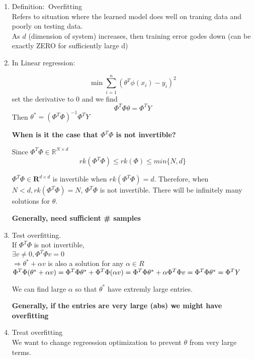 \documentclass[12pt]{article}
\newcommand{\defi}{{\color{blue} Definition: $\ $}}
\newcommand{\Rb}{\mathbf{R}}
\begin{document}
        \begin{enumerate}
            \item \defi Overfitting\\
            Refers to situation where the learned model does well on traning data and poorly on testing data.\\
            As $d$ (dimension of system) increases, then training error godes down (can be exactly ZERO for sufficiently large d)

            \item In Linear regression:
            
            $$\min \sum_{i = 1}^n (\theta^T \phi(x_i) - y_i)^2$$ set the derivative to 0 and we find $$\Phi^T \Phi \theta = \Phi^T Y$$ Then $\theta^* = (\Phi^T \Phi)^{-1}\Phi^T Y$

            \textbf{When is it the case that $\Phi^T\Phi$ is not invertible?}
            
            Since $\Phi^T \Phi \in \mathbb{R}^{N\times d}$ 
            $$rk(\Phi^T \Phi) \le rk(\Phi) \le min\{N,d\}$$

            $\Phi^T \Phi \in \Rb^{d \times d}$ is invertible when $rk(\Phi^T \Phi) = d$. Therefore, when $N < d, rk(\Phi^T \Phi) = N$, $\Phi^T \Phi $ is not invertible. There will be infinitely many solutions for $\theta$.

            \textbf{Generally, need sufficient \# samples}

            \item Test overfitting.\\
            If $\Phi^T \Phi$ is not invertible,\\
            $\exists v \ne 0 , \Phi^T \Phi v = 0$\\
            $\Rightarrow \theta^* + \alpha v$ is also a solution for any $\alpha \in R$\\
            $\Phi^T \Phi (\theta^* + \alpha v) = \Phi^T \Phi \theta^* + \Phi^T \Phi (\alpha v) \\ = \Phi^T \Phi \theta^* + \alpha \Phi^T \Phi v \\ = \Phi^T \Phi \theta^* = \Phi^T Y$

            We can find large $\alpha$ so that $\theta^*$ have extremly large entries.

            \textbf{Generally, if the entries are very large (abs) we might have overfitting}

            \item Treat overfitting\\
            We want to change regreession optimization to prevent $\theta$ from very large terms.


\end{enumerate}
\end{document}
